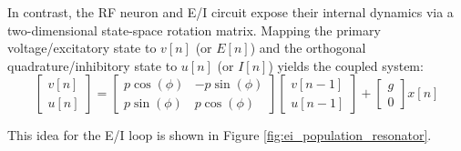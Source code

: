 In contrast, the RF neuron and E/I circuit expose their internal dynamics via a two-dimensional state-space rotation matrix. Mapping the primary voltage/excitatory state to $v[n]$ (or $E[n]$) and the orthogonal quadrature/inhibitory state to $u[n]$ (or $I[n]$) yields the coupled system:
\begin{equation}
    \begin{bmatrix} v[n] \\ u[n] \end{bmatrix} = \begin{bmatrix} p\cos(\phi) & -p\sin(\phi) \\ p\sin(\phi) & p\cos(\phi) \end{bmatrix} \begin{bmatrix} v[n-1] \\ u[n-1] \end{bmatrix} + \begin{bmatrix} g \\ 0 \end{bmatrix} x[n]
\end{equation}

This idea for the E/I loop is shown in Figure \ref{fig:ei_population_resonator}.

